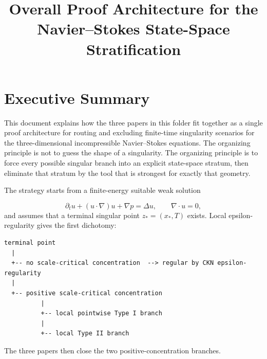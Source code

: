 \documentclass[11pt]{amsart}
\title{Overall Proof Architecture for the Navier--Stokes State-Space Stratification}
\author{}
\date{}
\begin{document}
\maketitle


\section{Executive Summary}

This document explains how the three papers in this folder fit together as a single proof architecture for routing and excluding finite-time singularity scenarios for the three-dimensional incompressible Navier--Stokes equations. The organizing principle is not to guess the shape of a singularity.  The organizing principle is to force every possible singular branch into an explicit state-space stratum, then eliminate that stratum by the tool that is strongest for exactly that geometry.

The strategy starts from a finite-energy suitable weak solution

\[
  \partial_t u+(u\cdot\nabla)u+\nabla p=\Delta u,
  \qquad \nabla\cdot u=0,
\]
and assumes that a terminal singular point \(z_*=(x_*,T)\) exists.  Local epsilon-regularity gives the first dichotomy:

\begin{center}
\begin{minipage}{0.92\linewidth}
\scriptsize
\begin{verbatim}
terminal point
  |
  +-- no scale-critical concentration  --> regular by CKN epsilon-regularity
  |
  +-- positive scale-critical concentration
          |
          +-- local pointwise Type I branch
          |
          +-- local Type II branch
\end{verbatim}
\end{minipage}
\end{center}

The three papers then close the two positive-concentration branches.
\end{document}
